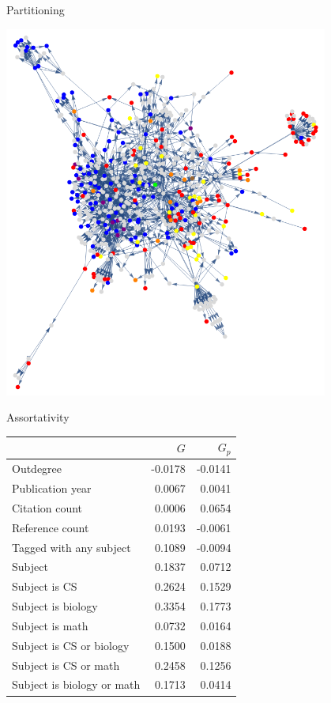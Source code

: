 \documentclass[xcolor=dvipsnames, 14pt]{beamer}
\begin{document}
\begin{frame}{Partitioning}
\begin{minipage}{0.4\linewidth}
\includegraphics[width=0.8\textwidth]{color_coded_right.png}
\end{minipage}
\end{frame}

\begin{frame}{Assortativity}
\centering
\footnotesize
\begin{tabular}{|l|r|r|}
\hline
 & $G$ & $G_p$ \\ \hline\hline
Outdegree & -0.0178 & -0.0141 \\ \hline
Publication year & 0.0067 & 0.0041 \\ \hline
Citation count & 0.0006 & 0.0654 \\ \hline
Reference count & 0.0193 & -0.0061 \\ \hline
Tagged with any subject & 0.1089 & -0.0094 \\ \hline
Subject & 0.1837 & 0.0712 \\ \hline
Subject is CS & 0.2624 & 0.1529 \\ \hline
Subject is biology & 0.3354 & 0.1773 \\ \hline
Subject is math & 0.0732 & 0.0164 \\ \hline
Subject is CS or biology & 0.1500 & 0.0188 \\ \hline
Subject is CS or math & 0.2458 & 0.1256 \\ \hline
Subject is biology or math & 0.1713 & 0.0414 \\ \hline
\end{tabular}
\end{frame}
\end{document}
